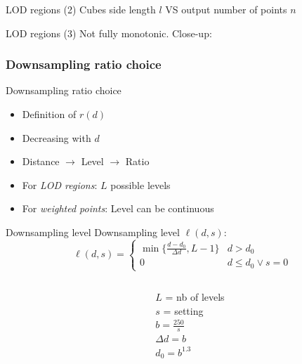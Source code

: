 \documentclass{beamer}
\begin{document}
\begin{frame}{LOD regions (2)}
	Cubes side length $l$ VS output number of points $n$ \\
	\resizebox{!}{0.6\textwidth}{}
\end{frame}


\begin{frame}{LOD regions (3)}
	Not fully monotonic. Close-up: \\
	\resizebox{!}{0.6\textwidth}{}
\end{frame}

\subsubsection{Downsampling ratio choice}

\begin{frame}{Downsampling ratio choice}
	\begin{itemize}
	\item Definition of $r(d)$
	\item Decreasing with $d$
	\item Distance $\rightarrow$ Level $\rightarrow$ Ratio
	\item For \emph{LOD regions}: $L$ possible levels
	\item For \emph{weighted points}: Level can be continuous
	\end{itemize}
\end{frame}

\begin{frame}{Downsampling level}
	Downsampling level $\ell(d, s)$: \\
	\begin{displaymath}
		\ell(d, s) = \begin{cases}
			\min \{ \frac{d - d_{0}}{\Delta d}, L-1 \} & d > d_{0} \\
			0 & d \leq d_{0} \vee s = 0
		\end{cases}
	\end{displaymath}
	\begin{columns}[c]
		\begin{column}[T]{.7\textwidth}
			\resizebox{!}{.65\textwidth}{}
		\end{column}
		\begin{column}[T]{.3\textwidth}
			$L$ = nb of levels \\
			$s$ = setting \\
			$b = \frac{250}{s}$ \\
			$\Delta d = b$ \\
			$d_{0} = b^{1.3}$
		\end{column}
	\end{columns}
\end{frame}
\end{document}
